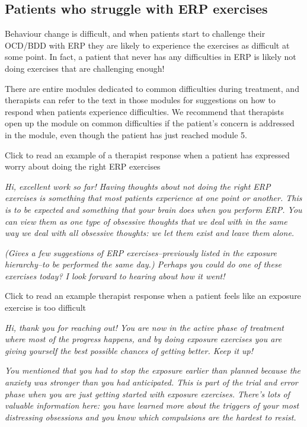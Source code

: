 \documentclass[]{book}
\begin{document}
\hypertarget{patients-who-struggle-with-erp-exercises}{%
\subsection{Patients who struggle with ERP exercises}\label{patients-who-struggle-with-erp-exercises}}

Behaviour change is difficult, and when patients start to challenge their OCD/BDD with ERP they are likely to experience the exercises as difficult at some point. In fact, a patient that never has any difficulties in ERP is likely not doing exercises that are challenging enough!

There are entire modules dedicated to common difficulties during treatment, and therapists can refer to the text in those modules for suggestions on how to respond when patients experience difficulties. We recommend that therapists open up the module on common difficulties if the patient's concern is addressed in the module, even though the patient has just reached module 5.

Click to read an example of a therapist response when a patient has expressed worry about doing the right ERP exercises

\emph{Hi, excellent work so far! Having thoughts about not doing the right ERP exercises is something that most patients experience at one point or another. This is to be expected and something that your brain does when you perform ERP. You can view them as one type of obsessive thoughts that we deal with in the same way we deal with all obsessive thoughts: we let them exist and leave them alone.}

\emph{(Gives a few suggestions of ERP exercises--previously listed in the exposure hierarchy--to be performed the same day.) Perhaps you could do one of these exercises today? I look forward to hearing about how it went!}

Click to read an example therapist response when a patient feels like an exposure exercise is too difficult

\emph{Hi, thank you for reaching out! You are now in the active phase of treatment where most of the progress happens, and by doing exposure exercises you are giving yourself the best possible chances of getting better. Keep it up!}

\emph{You mentioned that you had to stop the exposure earlier than planned because the anxiety was stronger than you had anticipated. This is part of the trial and error phase when you are just getting started with exposure exercises. There's lots of valuable information here: you have learned more about the triggers of your most distressing obsessions and you know which compulsions are the hardest to resist.}
\end{document}
